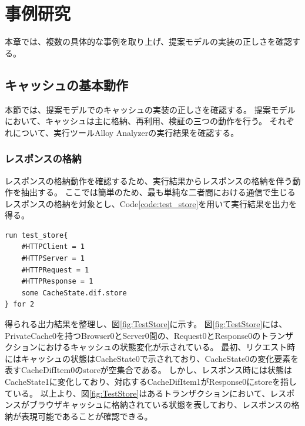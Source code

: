 \documentclass[12pt,a4paper]{jbook}
\begin{document}
\newpage

\chapter{事例研究}
本章では、複数の具体的な事例を取り上げ、提案モデルの実装の正しさを確認する。

\section{キャッシュの基本動作}
本節では、提案モデルでのキャッシュの実装の正しさを確認する。
提案モデルにおいて、キャッシュは主に格納、再利用、検証の三つの動作を行う。
それぞれについて、実行ツールAlloy Analyzerの実行結果を確認する。

\subsection{レスポンスの格納}
レスポンスの格納動作を確認するため、実行結果からレスポンスの格納を伴う動作を抽出する。
ここでは簡単のため、最も単純な二者間における通信で生じるレスポンスの格納を対象とし、Code\ref{code:test_store}を用いて実行結果を出力を得る。

\begin{lstlisting}[caption=レスポンスの格納, label=code:test_store]
run test_store{
	#HTTPClient = 1
	#HTTPServer = 1
	#HTTPRequest = 1
	#HTTPResponse = 1
	some CacheState.dif.store
} for 2
\end{lstlisting}

得られる出力結果を整理し、図\ref{fig:TestStore}に示す。
図\ref{fig:TestStore}には、PrivateCache0を持つBrowser0とServer0間の、Request0とResponse0のトランザクションにおけるキャッシュの状態変化が示されている。
最初、リクエスト時にはキャッシュの状態はCacheState0で示されており、CacheState0の変化要素を表すCacheDifItem0のstoreが空集合である。
しかし、レスポンス時には状態はCacheState1に変化しており、対応するCacheDifItem1がResponse0にstoreを指している。
以上より、図\ref{fig:TestStore}はあるトランザクションにおいて、レスポンスがブラウザキャッシュに格納されている状態を表しており、レスポンスの格納が表現可能であることが確認できる。
\end{document}

